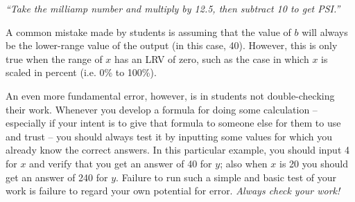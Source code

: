 {\it ``Take the milliamp number and multiply by 12.5, then subtract 10 to get PSI.''}

\vskip 10pt

A common mistake made by students is assuming that the value of $b$ will always be the lower-range value of the output (in this case, 40).  However, this is only true when the range of $x$ has an LRV of zero, such as the case in which $x$ is scaled in percent (i.e. 0\% to 100\%).

An even more fundamental error, however, is in students not double-checking their work.  Whenever you develop a formula for doing some calculation -- especially if your intent is to give that formula to someone else for them to use and trust -- you should always test it by inputting some values for which you already know the correct answers.  In this particular example, you should input 4 for $x$ and verify that you get an answer of 40 for $y$; also when $x$ is 20 you should get an answer of 240 for $y$.  Failure to run such a simple and basic test of your work is failure to regard your own potential for error.  {\it Always check your work!}




